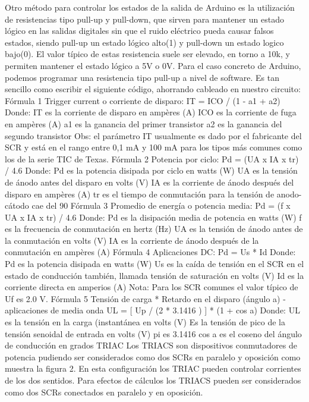 \documentclass[11pt,a4paper]{article}
\begin{document}
Otro método para controlar los estados de la salida de Arduino es la utilización de resistencias tipo pull-up y pull-down, que sirven para mantener un estado lógico en las salidas digitales sin que el ruido eléctrico pueda causar falsos estados, siendo pull-up un estado lógico alto(1) y pull-down un estado logico bajo(0).
El valor típico de estas resistencia suele ser elevado, en torno a 10k, y permiten mantener el estado lógico a 5V o 0V.
Para el caso concreto de Arduino, podemos programar una resistencia tipo pull-up a nivel de software. Es tan sencillo como escribir el siguiente código, ahorrando cableado en nuestro circuito:
Fórmula 1
Trigger current o corriente de disparo:
IT = ICO / (1 - a1 + a2)
Donde:
IT es la corriente de disparo en ampères (A)
ICO es la corriente de fuga en ampères (A)
a1 es la ganancia del primer transistor
a2 es la ganancia del segundo transistor
Obs: el parámetro IT usualmente es dado por el fabricante del SCR y está en el rango entre 0,1 mA y 100 mA para los tipos más comunes como los de la serie TIC de Texas.
Fórmula 2
Potencia por ciclo:
Pd = (UA x IA x tr) / 4.6
Donde:
Pd es la potencia disipada por ciclo en watts (W)
UA es la tensión de ánodo antes del disparo en volts (V)
IA es la corriente de ánodo después del disparo en ampères (A)
tr es el tiempo de conmutación para la tensión de anodo-cátodo cae del 90%
Fórmula 3
Promedio de energía o potencia media:
Pd = (f x UA x IA x tr) / 4.6
Donde:
Pd es la disipación media de potencia en watts (W)
 f es la frecuencia de conmutación en hertz (Hz)
UA es la tensión de ánodo antes de la conmutación en volts (V)
IA es la corriente de ánodo después de la conmutación en ampères (A)
Fórmula 4
Aplicaciones DC:
Pd = Us * Id
Donde:
Pd es la potencia disipada en watts (W)
Us es la caída de tensión en el SCR en el estado de conducción también, llamada tensión de saturación en volts (V)
Id es la corriente directa en amperios (A) 
Nota: Para los SCR comunes el valor típico de Uf es 2.0 V.
Fórmula 5
Tensión de carga * Retardo en el disparo (ángulo a) - aplicaciones de media onda
UL = [ Up / (2 * 3.1416 ) ] * (1 + cos a)
Donde:
UL es la tensión en la carga (instantánea en volts (V)
Es la tensión de pico de la tensión senoidal de entrada en volts (V)
pi es 3.1416
cos a es el coseno del ángulo de conducción en grados
TRIAC
Los TRIACS son dispositivos conmutadores de potencia pudiendo ser considerados como dos SCRs en paralelo y oposición como muestra la figura 2. En esta configuración los TRIAC pueden controlar corrientes de los dos sentidos. Para efectos de cálculos los TRIACS pueden ser considerados como dos SCRs conectados en paralelo y en oposición.
\end{document}
